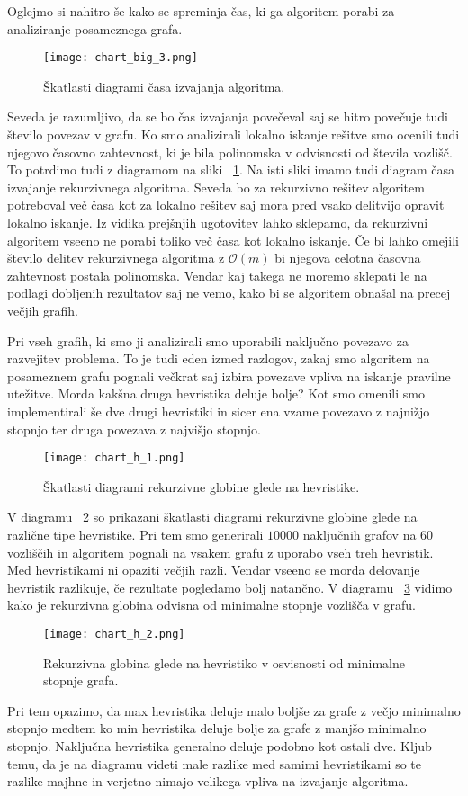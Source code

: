 \documentclass[12pt,a4paper,twoside]{article}
\theoremstyle{definition} %
\theoremstyle{plain} %
\numberwithin{equation}{section}  %
\begin{document}
Oglejmo si nahitro še kako se spreminja čas, ki ga algoritem porabi za analiziranje posameznega grafa.
 \begin{figure}[h!]
\caption{Škatlasti diagrami časa izvajanja algoritma.}
\label{chart_big_3}
\centering
    \texttt{[image: chart\_big\_3.png]}
    \end{figure}
Seveda je razumljivo, da se bo čas izvajanja povečeval saj se hitro povečuje tudi število povezav v grafu. Ko smo analizirali lokalno iskanje rešitve smo ocenili tudi njegovo časovno zahtevnost, ki je bila polinomska v odvisnosti od števila vozlišč. To potrdimo tudi z diagramom na sliki ~\ref{chart_big_3}. Na isti sliki imamo tudi diagram časa izvajanje rekurzivnega algoritma. Seveda bo za rekurzivno rešitev algoritem potreboval več časa kot za lokalno rešitev saj mora pred vsako delitvijo opravit lokalno iskanje. Iz vidika prejšnjih ugotovitev lahko sklepamo, da rekurzivni algoritem vseeno ne porabi toliko več časa kot lokalno iskanje. Če bi lahko omejili število delitev rekurzivnega algoritma z $\mathcal{O}(m)$ bi njegova celotna časovna zahtevnost postala polinomska. Vendar kaj takega ne moremo sklepati le na podlagi dobljenih rezultatov saj ne vemo, kako bi se algoritem obnašal na precej večjih grafih.

Pri vseh grafih, ki smo ji analizirali smo uporabili naključno povezavo za razvejitev problema. To je tudi eden izmed razlogov, zakaj smo algoritem na posameznem grafu pognali večkrat saj izbira povezave vpliva na iskanje pravilne utežitve. Morda kakšna druga hevristika deluje bolje? Kot smo omenili smo implementirali še dve drugi hevristiki in sicer ena vzame povezavo z najnižjo stopnjo ter druga povezava z najvišjo stopnjo. 
 \begin{figure}[h!]
\caption{Škatlasti diagrami rekurzivne globine glede na hevristike.}
\label{chart_h_1}
\centering
    \texttt{[image: chart\_h\_1.png]}
    \end{figure}
V diagramu ~\ref{chart_h_1} so prikazani škatlasti diagrami rekurzivne globine glede na različne tipe hevristike. Pri tem smo generirali $10000$ naključnih grafov na $60$ vozliščih in algoritem pognali na vsakem grafu z uporabo vseh treh hevristik. Med hevristikami ni opaziti večjih razli. Vendar vseeno se morda delovanje hevristik razlikuje, če rezultate pogledamo bolj natančno. V diagramu  ~\ref{chart_h_2} vidimo kako je rekurzivna globina odvisna od minimalne stopnje vozlišča v grafu.
 \begin{figure}[h!]
\caption{Rekurzivna globina glede na hevristiko v osvisnosti od minimalne stopnje grafa.}
\label{chart_h_2}
\centering
    \texttt{[image: chart\_h\_2.png]}
    \end{figure}
Pri tem opazimo, da max hevristika deluje malo boljše za grafe z večjo minimalno stopnjo medtem ko min hevristika deluje bolje za grafe z manjšo  minimalno stopnjo. Naključna hevristika generalno deluje podobno kot ostali dve. Kljub temu, da je na diagramu videti male razlike med samimi hevristikami so te razlike majhne in verjetno nimajo velikega vpliva na izvajanje algoritma.
\end{document}
